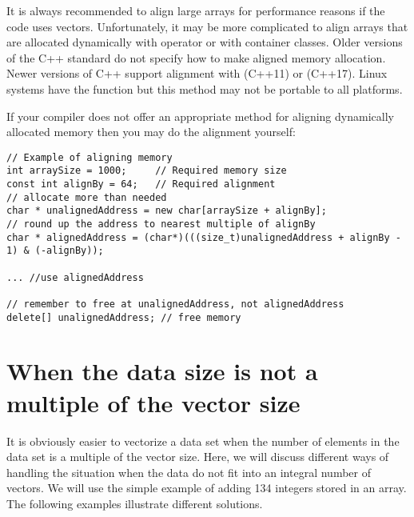\documentclass[vcl_manual.tex]{subfiles}
\begin{document}
It is always recommended to align large arrays for performance reasons if the code uses vectors. Unfortunately, it may be more complicated to align arrays that are allocated dynamically with operator  or with container classes. 
Older versions of the C++ standard do not specify how to make aligned memory allocation. Newer versions of C++ support alignment with  (C++11) or  (C++17). Linux systems have the function  but this method may not be portable to all platforms.

If your compiler does not offer an appropriate method for aligning dynamically allocated memory then you may do the alignment yourself:

\begin{lstlisting}[frame=none]
// Example of aligning memory
int arraySize = 1000;     // Required memory size
const int alignBy = 64;   // Required alignment
// allocate more than needed
char * unalignedAddress = new char[arraySize + alignBy];
// round up the address to nearest multiple of alignBy
char * alignedAddress = (char*)(((size_t)unalignedAddress + alignBy - 1) & (-alignBy));

... //use alignedAddress

// remember to free at unalignedAddress, not alignedAddress
delete[] unalignedAddress; // free memory

\end{lstlisting}



\section{When the data size is not a multiple of the vector size}\label{NotAMultipleOfVectorSize}

It is obviously easier to vectorize a data set when the number of elements in the data set is a multiple of the vector size. Here, we will discuss different ways of handling the situation when the data do not fit into an integral number of vectors. We will use the simple example of adding 134 integers stored in an array. The following examples illustrate different solutions.
\end{document}
